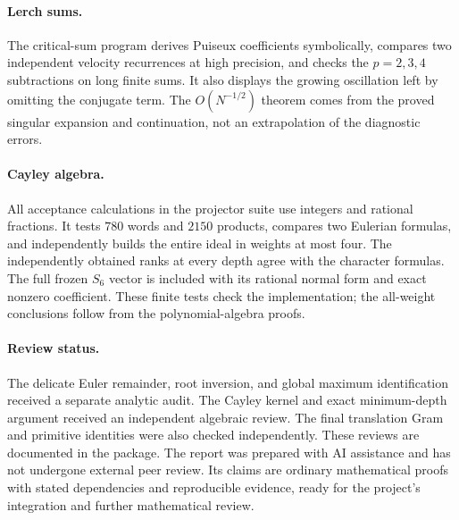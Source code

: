 \documentclass[11pt,a4paper]{article}
\numberwithin{equation}{section}
\theoremstyle{definition}
\theoremstyle{remark}
\begin{document}
\paragraph{Lerch sums.}
The critical-sum program derives Puiseux coefficients symbolically,
compares two independent velocity recurrences at high precision, and
checks the $p=2,3,4$ subtractions on long finite sums. It also displays
the growing oscillation left by omitting the conjugate term.
The $O(N^{-1/2})$ theorem comes from the proved singular expansion
and continuation, not an extrapolation of the diagnostic errors.

\paragraph{Cayley algebra.}
All acceptance calculations in the projector suite use integers and
rational fractions. It tests $780$ words and $2150$ products, compares
two Eulerian formulas, and independently builds the entire ideal in
weights at most four. The independently obtained ranks at every depth
agree with the character formulas. The full frozen $S_6$ vector is
included with its rational normal form and exact nonzero coefficient.
These finite tests check the implementation; the all-weight
conclusions follow from the polynomial-algebra proofs.

\paragraph{Review status.}
The delicate Euler remainder, root inversion, and global maximum
identification received a separate analytic audit. The Cayley kernel
and exact minimum-depth argument received an independent algebraic
review. The final translation Gram and primitive identities were also
checked independently. These reviews are documented in the package.
The report was prepared with AI assistance and has not undergone
external peer review. Its claims are ordinary mathematical proofs
with stated dependencies and reproducible evidence, ready for the
project's integration and further mathematical review.


\clearpage
\end{document}
